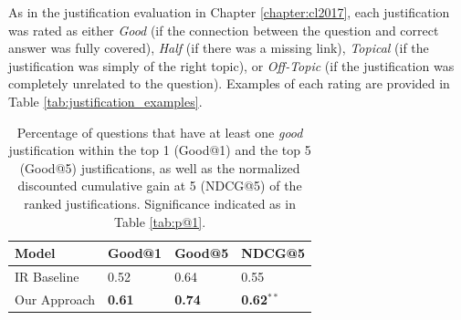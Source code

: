 As in the justification evaluation in Chapter \ref{chapter:cl2017}, each justification was rated as either \emph{Good} (if the connection between the question and correct answer was fully covered), \emph{Half} (if there was a missing link), \emph{Topical} (if the justification was simply of the right topic), or \emph{Off-Topic} (if the justification was completely unrelated to the question). Examples of each rating are provided in Table \ref{tab:justification_examples}.  

\begin{table}[t]
\begin{center}
\begin{tabular}{llll}
\hline
 Model 			& Good@1 	& Good@5 	& NDCG@5 \\ 
\hline
IR Baseline 	&	0.52 		&	0.64 		& 0.55 \\
Our Approach & 	{\bf 0.61}	 	&	{\bf 0.74}			& {\bf 0.62}$^{**}$ \\
\end{tabular}
\caption{{Percentage of questions that have at least one \emph{good} justification within the top 1 (Good@1) and the top 5 (Good@5) justifications, 
as well as the normalized discounted cumulative gain at 5 (NDCG@5) of the ranked justifications.
 Significance indicated as in Table \ref{tab:p@1}.
}} 
\label{tab:justification_ndcg}
\end{center}
\end{table}




